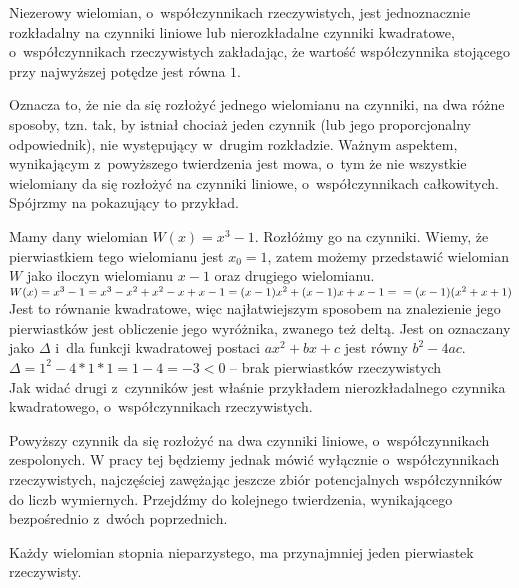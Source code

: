 \begin{theorem}
	$ $\\
	Niezerowy wielomian, o~współczynnikach rzeczywistych, jest jednoznacznie rozkładalny na czynniki liniowe lub nierozkładalne czynniki kwadratowe, o~współczynnikach rzeczywistych zakładając, że wartość współczynnika stojącego przy najwyższej potędze jest równa $1$.
\end{theorem}

Oznacza to, że nie da się rozłożyć jednego wielomianu na czynniki, na dwa różne sposoby, tzn. tak, by istniał chociaż jeden czynnik (lub jego proporcjonalny odpowiednik), nie występujący w~drugim rozkładzie. Ważnym aspektem, wynikającym z~powyższego twierdzenia jest mowa, o~tym że nie wszystkie wielomiany da się rozłożyć na czynniki liniowe, o~współczynnikach całkowitych. Spójrzmy na pokazujący to przykład.

\begin{example}
	$ $\\
	Mamy dany wielomian $W(x)=x^3-1$. Rozłóżmy go na czynniki.
	Wiemy, że pierwiastkiem tego wielomianu jest $x_0 = 1$, zatem możemy przedstawić wielomian $W$ jako iloczyn wielomianu $x-1$ oraz drugiego wielomianu. \\
	$W(x)=x^3-1=x^3-x^2+x^2-x+x-1=(x-1)x^2+(x-1)x+x-1 = \\
	=(x-1)(x^2+x+1)$ \\
	Jest to równanie kwadratowe, więc najłatwiejszym sposobem na znalezienie jego pierwiastków jest obliczenie jego wyróżnika, zwanego też deltą. Jest on oznaczany jako $\Delta$ i~dla funkcji kwadratowej postaci $ax^2+bx+c$ jest równy $b^2-4ac$. \\
	$\Delta = 1^2 - 4*1*1 = 1 - 4 = -3 < 0$ -- brak pierwiastków rzeczywistych\\
	Jak widać drugi z~czynników jest właśnie przykładem nierozkładalnego czynnika kwadratowego, o~współczynnikach rzeczywistych.
\end{example}

Powyższy czynnik da się rozłożyć na dwa czynniki liniowe, o~współczynnikach zespolonych. W pracy tej będziemy jednak mówić wyłącznie o~współczynnikach rzeczywistych, najczęściej zawężając jeszcze zbiór potencjalnych współczynników do liczb wymiernych. Przejdźmy do kolejnego twierdzenia, wynikającego bezpośrednio z~dwóch poprzednich.

\begin{theorem}
	$ $\\
	Każdy wielomian stopnia nieparzystego, ma przynajmniej jeden pierwiastek rzeczywisty.
\end{theorem}

